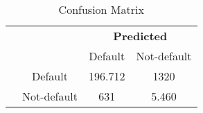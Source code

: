 \begin{table}[H]
     \centering
     \caption{Confusion Matrix}
     \label{tab:Confusion_matrix}
     \begin{tabular}{@{}cc cc@{}}
     \multicolumn{1}{c}{} &\multicolumn{1}{c}{} &\multicolumn{2}{c}{\textbf{Predicted}} \\
     \cmidrule(lr){3-4}
     \multicolumn{1}{c}{} & 
     \multicolumn{1}{c}{} & 
     \multicolumn{1}{c}{Default} & 
     \multicolumn{1}{c}{Not-default} \\
     \vspace{0.1cm}
     \cline{2-4}
     \multirow[c]{2}{*}{\rotatebox[origin=tr]{90}{\textbf{Actual}}} & Default  & 196.712 & 1320 \\[1.5ex] & Not-default &631 & 5.460 \\ \cline{2-4}
     \end{tabular}
     \end{table}